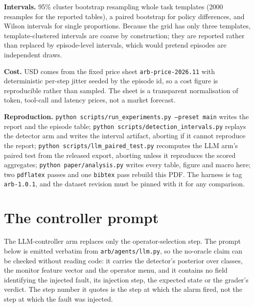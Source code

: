 \textbf{Intervals.} 95\% cluster bootstrap resampling whole task templates (2000 resamples for
the reported tables), a paired bootstrap for policy differences, and Wilson intervals for
single proportions. Because the grid has only three templates, template-clustered intervals are
coarse by construction; they are reported rather than replaced by episode-level intervals,
which would pretend episodes are independent draws.

\textbf{Cost.} USD comes from the fixed price sheet \texttt{arb-price-2026.11} with
deterministic per-step jitter seeded by the episode id, so a cost figure is reproducible
rather than sampled. The sheet is a transparent normalisation of token, tool-call and latency
prices, not a market forecast.

\begin{sloppypar}
\textbf{Reproduction.} \texttt{python scripts/run\_experiments.py --preset main} writes the
report and the episode table; \texttt{python scripts/detection\_intervals.py} replays the
detector arm and writes the interval artifact, aborting if it cannot reproduce the report;
\texttt{python scripts/llm\_paired\_test.py} recomputes the LLM arm's paired test from the
released export, aborting unless it reproduces the scored aggregates;
\texttt{python paper/analysis.py} writes every table, figure and macro here; two
\texttt{pdflatex} passes and one \texttt{bibtex} pass rebuild this PDF. The harness is tag
\texttt{arb-1.0.1}, and the dataset revision must be pinned with it for any comparison.
\end{sloppypar}

\section{The controller prompt}\label{app:prompt}

The LLM-controller arm replaces only the operator-selection step. The prompt below is emitted
verbatim from \texttt{arb/agents/llm.py}, so the no-oracle claim can be checked without reading
code: it carries the detector's posterior over classes, the monitor feature vector and the
operator menu, and it contains no field identifying the injected fault, its injection step,
the expected state or the grader's verdict. The step number it quotes is the step at which the
alarm fired, not the step at which the fault was injected.



